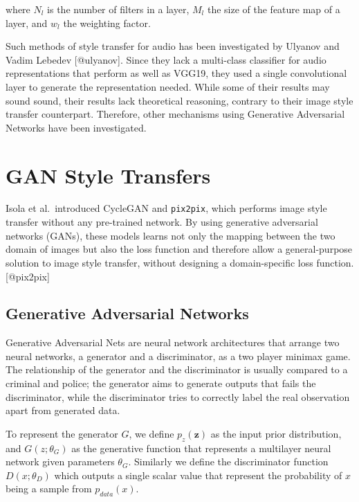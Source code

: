 \documentclass[]{report}
\begin{document}
where \(N_l\) is the number of filters in a layer, \(M_l\) the size of
the feature map of a layer, and \(w_l\) the weighting factor.

Such methods of style transfer for audio has been investigated by
Ulyanov and Vadim Lebedev {[}@ulyanov{]}. Since they lack a multi-class
classifier for audio representations that perform as well as VGG19, they
used a single convolutional layer to generate the representation needed.
While some of their results may sound sound, their results lack
theoretical reasoning, contrary to their image style transfer
counterpart. Therefore, other mechanisms using Generative Adversarial
Networks have been investigated.

\hypertarget{gan-style-transfers}{%
\section{GAN Style Transfers}\label{gan-style-transfers}}

Isola et al.~introduced CycleGAN and \texttt{pix2pix}, which performs
image style transfer without any pre-trained network. By using
generative adversarial networks (GANs), these models learns not only the
mapping between the two domain of images but also the loss function and
therefore allow a general-purpose solution to image style transfer,
without designing a domain-specific loss function. {[}@pix2pix{]}

\hypertarget{generative-adversarial-networks}{%
\subsection{Generative Adversarial
Networks}\label{generative-adversarial-networks}}

Generative Adversarial Nets are neural network architectures that
arrange two neural networks, a generator and a discriminator, as a two
player minimax game. The relationship of the generator and the
discriminator is usually compared to a criminal and police; the
generator aims to generate outputs that fails the discriminator, while
the discriminator tries to correctly label the real observation apart
from generated data.

To represent the generator \(G\), we define \(p_z(\mathbf{z})\) as the
input prior distribution, and \(G(z; \theta_G)\) as the generative
function that represents a multilayer neural network given parameters
\(\theta_G\). Similarly we define the discriminator function
\(D(x; \theta_D)\) which outputs a single scalar value that represent
the probability of \(x\) being a sample from \(p_{data}(x)\).
\end{document}
